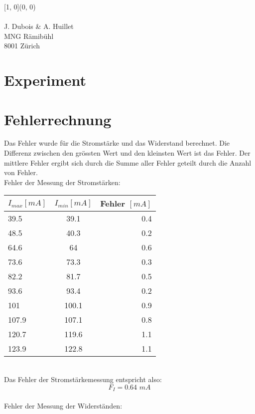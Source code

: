 \documentclass[12pt, a4paper, twoside]{article}
\begin{document}
    \begin{textblock}{\pgfmathresult}[1, 0](0, 0)
    \noindent
    \\\\ J. Dubois \& A. Huillet\\ MNG Rämibühl\\ 8001 Zürich
    \end{textblock}
    

    \newpage
    
    \section{Experiment}
    \newpage
    \section{Fehlerrechnung}
    Das Fehler wurde für die Stromstärke und das Widerstand berechnet. Die Differenz zwischen den grössten Wert und den kleinsten Wert ist das Fehler. Der mittlere Fehler ergibt sich durch die Summe aller Fehler geteilt durch die Anzahl von Fehler.
    \vspace{1cm}\\
    Fehler der Messung der Stromstärken:
    \vspace{1cm}\\
        \begin{tabular}{l|c|r}
            $I_{max} [mA]$ & $I_{min} [mA]$ &Fehler $[mA]$\\
            \hline
            39.5   & 39.1   &  0.4  \\
            48.5   & 40.3   & 0.2  \\
            64.6   & 64   & 0.6  \\
            73.6   & 73.3   & 0.3  \\
            82.2   & 81.7   & 0.5  \\
            93.6   & 93.4   & 0.2  \\
            101   & 100.1   & 0.9  \\
            107.9 & 107.1 & 0.8 \\
            120.7   & 119.6   & 1.1  \\
            123.9   & 122.8   & 1.1  
        \end{tabular}
        \vspace{1cm}\\
        Das Fehler der Stromstärkemessung entspricht also:
        \[F_I = 0.64 \hspace{4pt} mA\]
        \vspace{1cm}\\
        Fehler der Messung der Widerständen:
        \vspace{1cm}\\
        \begin{tabular}{l|c|r}
            
            
        \end{tabular}
\end{document}
